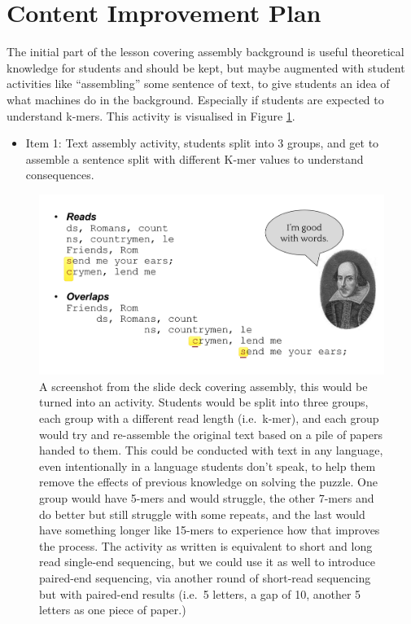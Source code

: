 \documentclass[paper=a4,justified,a4paper]{tufte-handout}
\providecommand{\tightlist}{%
  \setlength{\itemsep}{0pt}\setlength{\parskip}{0pt}}
\begin{document}
\hypertarget{content-improvement-plan}{%
\section{Content Improvement Plan}\label{content-improvement-plan}}

The initial part of the lesson covering assembly background is useful
theoretical knowledge for students and should be kept, but maybe
augmented with student activities like ``assembling'' some sentence of
text, to give students an idea of what machines do in the background.
Especially if students are expected to understand k-mers. This activity
is visualised in Figure \ref{fig:activity}.

\begin{itemize}
\tightlist
\item
  Item 1: Text assembly activity, students split into 3 groups, and get
  to assemble a sentence split with different K-mer values to understand
  consequences.
\end{itemize}

\begin{figure}
\centering
\includegraphics{./activity.png}
\caption{A screenshot from the slide deck covering assembly, this would
be turned into an activity. Students would be split into three groups,
each group with a different read length (i.e.~k-mer), and each group
would try and re-assemble the original text based on a pile of papers
handed to them. This could be conducted with text in any language, even
intentionally in a language students don't speak, to help them remove
the effects of previous knowledge on solving the puzzle. One group would
have 5-mers and would struggle, the other 7-mers and do better but still
struggle with some repeats, and the last would have something longer
like 15-mers to experience how that improves the process. The activity
as written is equivalent to short and long read single-end sequencing,
but we could use it as well to introduce paired-end sequencing, via
another round of short-read sequencing but with paired-end results
(i.e.~5 letters, a gap of 10, another 5 letters as one piece of
paper.)\label{fig:activity}}
\end{figure}
\end{document}

